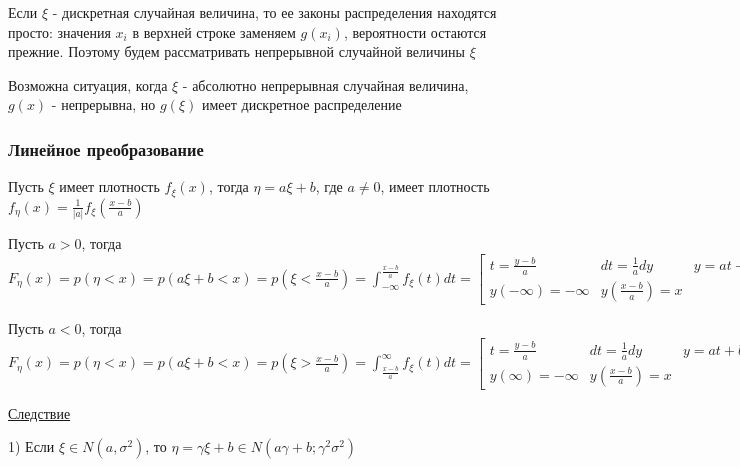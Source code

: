 \documentclass[12pt]{article}
\begin{document}
    \Nota Если $\xi$ - дискретная случайная величина, то ее законы распределения находятся просто: значения $x_i$ в верхней строке заменяем $g(x_i)$, вероятности остаются прежние.
    Поэтому будем рассматривать непрерывной случайной величины $\xi$

    \Notas Возможна ситуация, когда $\xi$ - абсолютно непрерывная случайная величина, $g(x)$ - непрерывна, но $g(\xi)$ имеет дискретное распределение

    \subsubsection{Линейное преобразование}

    \hypertarget{lineartransformation}{}

    \begin{MyTheorem}
        \Ths Пусть $\xi$ имеет плотность $f_\xi(x)$, тогда $\eta = a\xi + b$, где $a \neq 0$, имеет плотность $f_\eta(x) = \frac{1}{|a|}f_\xi\left(\frac{x - b}{a}\right)$
    \end{MyTheorem}

    \begin{MyProof}
        Пусть $a > 0$, тогда $F_\eta(x) = p(\eta < x) = p(a\xi + b < x) = p(\xi < \frac{x - b}{a}) = \int_{-\infty}^{\frac{x - b}{a}} f_\xi(t) dt = 
        \left[\begin{matrix}t = \frac{y - b}{a} & dt = \frac{1}{a} dy & y = at + b \\ y(-\infty) = -\infty & y(\frac{x - b}{a}) = x\end{matrix}\right] = 
        \int_{-\infty}^x \frac{1}{a} f_\xi(\frac{y - b}{a}) dy \Longrightarrow \eta = \frac{1}{|a|} f_\xi (\frac{x - b}{a})$

        Пусть $a < 0$, тогда $F_\eta(x) = p(\eta < x) = p(a\xi + b < x) = p(\xi > \frac{x - b}{a}) = \int_{\frac{x - b}{a}}^{\infty} f_\xi(t) dt = 
        \left[\begin{matrix}t = \frac{y - b}{a} & dt = \frac{1}{a} dy & y = at + b \\ y(\infty) = -\infty & y(\frac{x - b}{a}) = x\end{matrix}\right] = 
        -\int_{-\infty}^x \frac{1}{a} f_\xi(\frac{y - b}{a}) dy \Longrightarrow \eta = \frac{1}{|a|} f_\xi (\frac{x - b}{a})$
    \end{MyProof}

    \underline{Следствие}

    1) Если $\xi \in N(a, \sigma^2)$, то $\eta = \gamma \xi + b \in N(a\gamma + b; \gamma^2 \sigma^2)$
\end{document}
